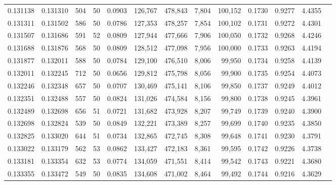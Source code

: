 \begin{tabular}{rrrrrrrrrrrrr}
0.131138 & 0.131310 &   504 &  50 &                                     0.0903 & 126,767 & 478,843 &   7,804 & 100,152 & 0.1730 & 0.9277 & 4.4355 \\
0.131311 & 0.131502 &   586 &  50 &                                     0.0786 & 127,353 & 478,257 &   7,854 & 100,102 & 0.1731 & 0.9272 & 4.4301 \\
0.131507 & 0.131686 &   591 &  52 &                                     0.0809 & 127,944 & 477,666 &   7,906 & 100,050 & 0.1732 & 0.9268 & 4.4246 \\
0.131688 & 0.131876 &   568 &  50 &                                     0.0809 & 128,512 & 477,098 &   7,956 & 100,000 & 0.1733 & 0.9263 & 4.4194 \\
0.131877 & 0.132011 &   588 &  50 &                                     0.0784 & 129,100 & 476,510 &   8,006 &  99,950 & 0.1734 & 0.9258 & 4.4139 \\
0.132011 & 0.132245 &   712 &  50 &                                     0.0656 & 129,812 & 475,798 &   8,056 &  99,900 & 0.1735 & 0.9254 & 4.4073 \\
0.132246 & 0.132348 &   657 &  50 &                                     0.0707 & 130,469 & 475,141 &   8,106 &  99,850 & 0.1737 & 0.9249 & 4.4012 \\
0.132351 & 0.132488 &   557 &  50 &                                     0.0824 & 131,026 & 474,584 &   8,156 &  99,800 & 0.1738 & 0.9245 & 4.3961 \\
0.132489 & 0.132698 &   656 &  51 &                                     0.0721 & 131,682 & 473,928 &   8,207 &  99,749 & 0.1739 & 0.9240 & 4.3900 \\
0.132698 & 0.132824 &   539 &  50 &                                     0.0849 & 132,221 & 473,389 &   8,257 &  99,699 & 0.1740 & 0.9235 & 4.3850 \\
0.132825 & 0.133020 &   644 &  51 &                                     0.0734 & 132,865 & 472,745 &   8,308 &  99,648 & 0.1741 & 0.9230 & 4.3791 \\
0.133022 & 0.133179 &   562 &  53 &                                     0.0862 & 133,427 & 472,183 &   8,361 &  99,595 & 0.1742 & 0.9226 & 4.3738 \\
0.133181 & 0.133354 &   632 &  53 &                                     0.0774 & 134,059 & 471,551 &   8,414 &  99,542 & 0.1743 & 0.9221 & 4.3680 \\
0.133355 & 0.133472 &   549 &  50 &                                     0.0835 & 134,608 & 471,002 &   8,464 &  99,492 & 0.1744 & 0.9216 & 4.3629 \\

\end{tabular}
